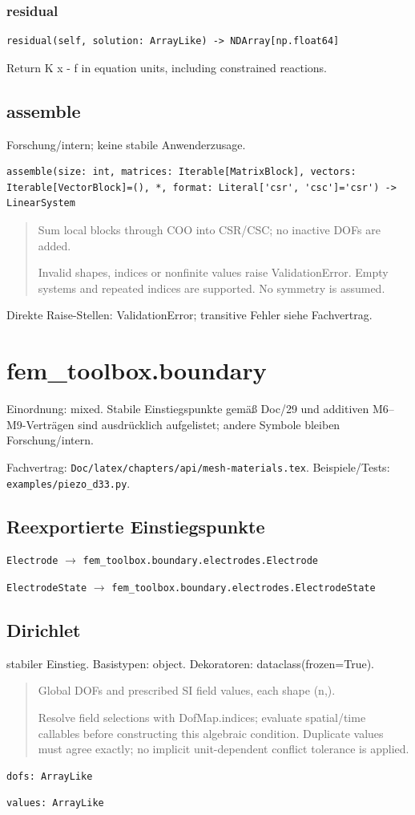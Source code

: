 \subsubsection*{residual}
\begin{lstlisting}
residual(self, solution: ArrayLike) -> NDArray[np.float64]
\end{lstlisting}
Return K x - f in equation units, including constrained reactions.
\subsection{assemble}
Forschung/intern; keine stabile Anwenderzusage.
\begin{lstlisting}
assemble(size: int, matrices: Iterable[MatrixBlock], vectors: Iterable[VectorBlock]=(), *, format: Literal['csr', 'csc']='csr') -> LinearSystem
\end{lstlisting}
\begin{quote}
Sum local blocks through COO into CSR/CSC; no inactive DOFs are added.\par Invalid shapes, indices or nonfinite values raise ValidationError. Empty systems and repeated indices are supported. No symmetry is assumed.
\end{quote}
Direkte Raise-Stellen: ValidationError; transitive Fehler siehe Fachvertrag.
\section{fem\_toolbox.boundary}
Einordnung: mixed. Stabile Einstiegspunkte gemäß Doc/29 und additiven M6–M9-Verträgen sind ausdrücklich aufgelistet; andere Symbole bleiben Forschung/intern.
\par Fachvertrag: \nolinkurl{Doc/latex/chapters/api/mesh-materials.tex}. Beispiele/Tests:
\nolinkurl{examples/piezo_d33.py}.
\subsection*{Reexportierte Einstiegspunkte}
\noindent\nolinkurl{Electrode} $\to$ \nolinkurl{fem_toolbox.boundary.electrodes.Electrode}\par
\noindent\nolinkurl{ElectrodeState} $\to$ \nolinkurl{fem_toolbox.boundary.electrodes.ElectrodeState}\par
\subsection{Dirichlet}
stabiler Einstieg.
Basistypen: object. Dekoratoren: dataclass(frozen=True).
\begin{quote}
Global DOFs and prescribed SI field values, each shape (n,).\par Resolve field selections with DofMap.indices; evaluate spatial/time callables before constructing this algebraic condition. Duplicate values must agree exactly; no implicit unit-dependent conflict tolerance is applied.
\end{quote}
\begin{lstlisting}
dofs: ArrayLike
\end{lstlisting}
\begin{lstlisting}
values: ArrayLike
\end{lstlisting}
